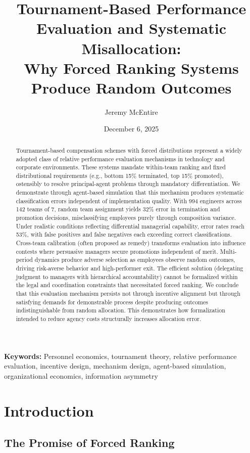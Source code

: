 \documentclass[12pt]{article}
\title{Tournament-Based Performance Evaluation and Systematic Misallocation: \\
Why Forced Ranking Systems Produce Random Outcomes}
\author{Jeremy McEntire}
\date{December 6, 2025}
\begin{document}
\maketitle

\begin{abstract}
Tournament-based compensation schemes with forced distributions represent a widely adopted class of relative performance evaluation mechanisms in technology and corporate environments. These systems mandate within-team ranking and fixed distributional requirements (e.g., bottom 15\% terminated, top 15\% promoted), ostensibly to resolve principal-agent problems through mandatory differentiation. We demonstrate through agent-based simulation that this mechanism produces systematic classification errors independent of implementation quality. With 994 engineers across 142 teams of 7, random team assignment yields 32\% error in termination and promotion decisions, misclassifying employees purely through composition variance. Under realistic conditions reflecting differential managerial capability, error rates reach 53\%, with false positives and false negatives each exceeding correct classifications. Cross-team calibration (often proposed as remedy) transforms evaluation into influence contests where persuasive managers secure promotions independent of merit. Multi-period dynamics produce adverse selection as employees observe random outcomes, driving risk-averse behavior and high-performer exit. The efficient solution (delegating judgment to managers with hierarchical accountability) cannot be formalized within the legal and coordination constraints that necessitated forced ranking. We conclude that this evaluation mechanism persists not through incentive alignment but through satisfying demands for demonstrable process despite producing outcomes indistinguishable from random allocation. This demonstrates how formalization intended to reduce agency costs structurally increases allocation error.
\end{abstract}

\noindent\textbf{Keywords:} Personnel economics, tournament theory, relative performance evaluation, incentive design, mechanism design, agent-based simulation, organizational economics, information asymmetry

\section{Introduction}

\subsection{The Promise of Forced Ranking}
\end{document}
